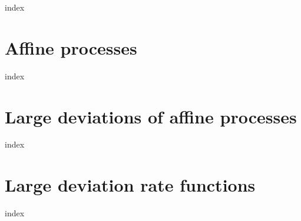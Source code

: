 \documentclass[leqno]{./preamble/ucthesis-CA2012}
\begin{document}
\begin{frontmatter}
  \renewcommand{\theequation}{\arabic{equation}}
  {index}
\end{frontmatter}

\begin{mainmatter}
  \renewcommand{\theequation}{\thechapter.\arabic{equation}}

  \pagestyle{fancy}
  \renewcommand{\chaptermark}[1]{\markboth{{\sf #1 \hspace*{\fill} Chapter~\thechapter}}{} }
  \renewcommand{\sectionmark}[1]{\markright{ {\sf Section~\thesection \hspace*{\fill} #1 }}}
  \fancyhf{}
  \makeatletter \if@twoside \fancyhead[LO]{\small \rightmark} \fancyhead[RE]{\small\leftmark} \else \fancyhead[LO]{\small\leftmark}
  \fancyhead[RE]{\small\rightmark} \fi
  \def\cleardoublepage{\clearpage\if@openright \ifodd\c@page\else
    \hbox{}
    \vspace*{\fill}
    \begin{center}
      This page intentionally left blank
    \end{center}
    \vspace{\fill}
    \thispagestyle{plain}
    \newpage
    \fi \fi}
  \makeatother
  \fancyfoot[c]{\textrm{\textup{\thepage}}} %
  \fancyfoot[C]{\thepage}
  \renewcommand{\headrulewidth}{0.4pt}
   { \fancyhf{} \fancyfoot[C]{\thepage}
  \renewcommand{\headrulewidth}{0pt}
  \renewcommand{\footrulewidth}{0pt}}

  \chapter{Affine processes}
  \label{affine-processes}
  {index}

  \chapter{Large deviations of affine processes}
  \label{large-deviations}
  {index}

  \chapter{Large deviation rate functions}
  \label{rate-functions}
  {index}

\end{mainmatter}
\end{document}
